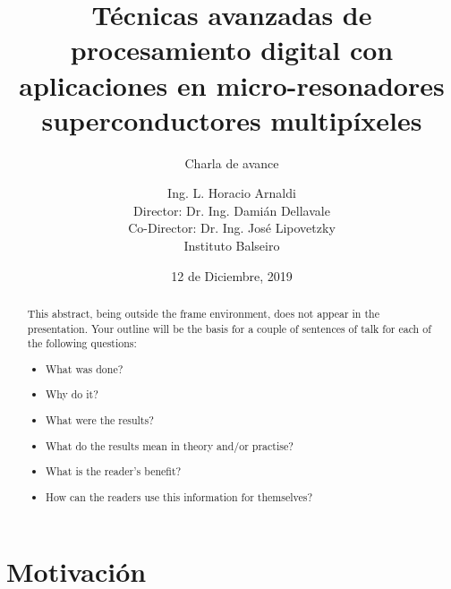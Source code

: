 \documentclass[ignorenonframetext,12pt]{beamer}
\title{Técnicas avanzadas de procesamiento digital con
aplicaciones en micro-resonadores superconductores multipíxeles}
\subtitle{\alert{Charla de avance}}
\author{Ing. L. Horacio Arnaldi\\
\vspace{0.4cm}
Director: Dr. Ing. Damián Dellavale\\
Co-Director: Dr. Ing. José Lipovetzky\\
\vspace{0.6cm}
Instituto Balseiro}
\date{12 de Diciembre, 2019}
\begin{document}
\begin{frame}
	\maketitle
\end{frame}

\begin{abstract}
	This abstract, being outside the frame environment, does not appear in
	the presentation.  Your outline will be the basis for a couple of
	sentences of talk for each of the following questions:
	\begin{itemize}
		\item What was done?
		\item Why do it?
		\item What were the results?
		\item What do the results mean in theory and/or practise?
		\item What is the reader's benefit?
		\item How can the readers use this information for themselves? 
	\end{itemize}
\end{abstract}


\section{Motivación}
\end{document}
